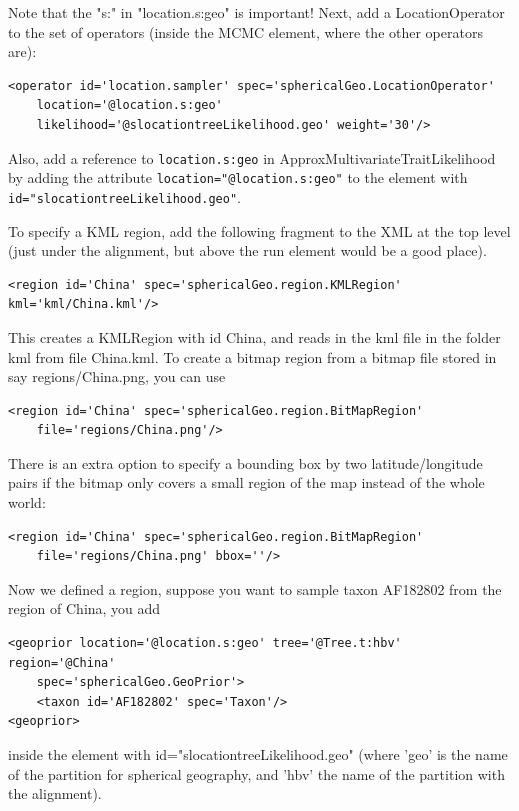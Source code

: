 \documentclass{article}
\begin{document}
Note that the "s:" in "location.s:geo" is important!
Next, add a LocationOperator to the set of operators (inside the MCMC element, where the other operators are):

\begin{verbatim}
<operator id='location.sampler' spec='sphericalGeo.LocationOperator' 
    location='@location.s:geo' 
    likelihood='@slocationtreeLikelihood.geo' weight='30'/>
\end{verbatim}

Also, add a reference to {\tt location.s:geo} in ApproxMultivariateTraitLikelihood by adding the attribute {\tt location="@location.s:geo"} to the element with {\tt id="slocationtreeLikelihood.geo"}.

To specify a KML region, add the following fragment to the XML at the top level (just under the alignment, but above the run element would be a good place).

\begin{verbatim}
<region id='China' spec='sphericalGeo.region.KMLRegion' kml='kml/China.kml'/>
\end{verbatim}

This creates a KMLRegion with id China, and reads in the kml file in the folder kml from file China.kml. To create a bitmap region from a bitmap file stored in say regions/China.png, you can use

\begin{verbatim}
<region id='China' spec='sphericalGeo.region.BitMapRegion'
	file='regions/China.png'/>
\end{verbatim}
There is an extra option to specify a bounding box by two latitude/longitude pairs if the bitmap only covers a small region of the map instead of the whole world:
\begin{verbatim}
<region id='China' spec='sphericalGeo.region.BitMapRegion'
	file='regions/China.png' bbox=''/>
\end{verbatim}



Now we defined a region, suppose you want to sample taxon AF182802 from the region of China, you add

\begin{verbatim}
<geoprior location='@location.s:geo' tree='@Tree.t:hbv' region='@China'
	spec='sphericalGeo.GeoPrior'>
	<taxon id='AF182802' spec='Taxon'/> 
<geoprior>
\end{verbatim}

inside the element with id="slocationtreeLikelihood.geo" (where 'geo' is the name of the partition for spherical geography, and 'hbv' the name of the partition with the alignment).
\end{document}
